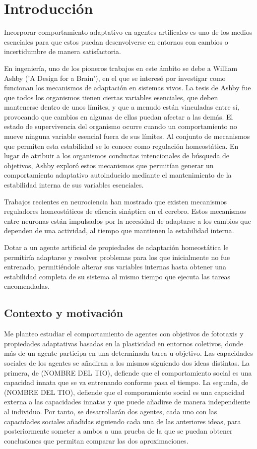 \chapter{Introducción}
Incorporar comportamiento adaptativo en agentes artificales es uno de los medios esenciales para que estos puedan desenvolverse en entornos con cambios o incertidumbre de manera satisfactoria.

En ingeniería, uno de los pioneros trabajos en este ámbito se debe a William Ashby ('A Design for a Brain'), en el que se interesó por investigar como funcionan los mecanismos de
adaptación en sistemas vivos. La tesis de Ashby fue que todos los organismos tienen ciertas variables esenciales, que deben mantenerse dentro de unos límites, y que a menudo están
vinculadas entre sí, provocando que cambios en algunas de ellas puedan afectar a las demás. El estado de supervivencia del organismo ocurre cuando un comportamiento no mueve ninguna variable esencial
fuera de sus límites. Al conjunto de mecanismos que permiten esta estabilidad se lo conoce como regulación homeostática. En lugar de atribuir a los organismos conductas intencionales de búsqueda de objetivos,
Ashby exploró estos mecanismos que permitían generar un comportamiento adaptativo autoinducido mediante el mantenimiento de la estabilidad interna de sus variables esenciales.

Trabajos recientes en neurociencia han mostrado que existen mecanismos reguladores homeostáticos de eficacia sináptica en el cerebro. Estos mecanismos entre neuronas están impulsados por la
necesidad de adaptarse a los cambios que dependen de una actividad, al tiempo que mantienen la estabilidad interna.

Dotar a un agente artificial de propiedades de adaptación homeostática le permitiría adaptarse y resolver problemas para los que inicialmente no fue entrenado, permitiéndole alterar sus variables
internas hasta obtener una estabilidad completa de su sistema al mismo tiempo que ejecuta las tareas encomendadas.

\section{Contexto y motivación}
Me planteo estudiar el comportamiento de agentes con objetivos de fototaxis y propiedades adaptativas basadas en la plasticidad en entornos coletivos, donde más de un agente participa en una
determinada tarea u objetivo. Las capacidades sociales de los agentes se añadiran a los mismos siguiendo dos ideas distintas. La primera, de (NOMBRE DEL TIO), defiende que el comportamiento
social es una capacidad innata que se va entrenando conforme pasa el tiempo. La segunda, de (NOMBRE DEL TIO), defiende que el comporamiento social es una capacidad externa a las capacidades innatas
y que puede añadirse de manera independiente al individuo. Por tanto, se desarrollarán dos agentes, cada uno con las capacidades sociales añadidas siguiendo cada una de las anteriores ideas, para posteriormente
someter a ambos a una prueba de la que se puedan obtener conclusiones que permitan comparar las dos aproximaciones.

